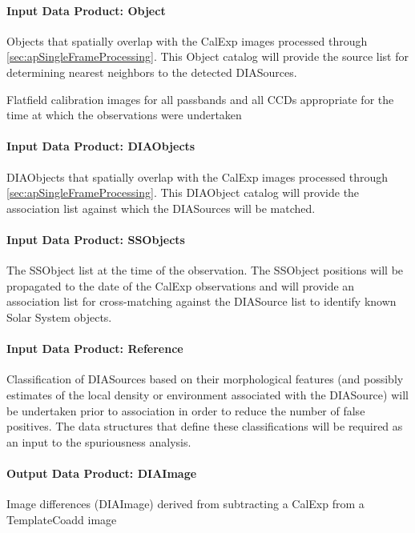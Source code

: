 \paragraph{Input Data Product: Object}

Objects that spatially overlap with the CalExp images processed through \ref{sec:apSingleFrameProcessing}. This Object catalog will provide the source list for determining nearest neighbors to the detected DIASources. 

Flatfield calibration images for all passbands and all CCDs appropriate for the time at which the observations were undertaken 

\paragraph{Input Data Product: DIAObjects}

DIAObjects that spatially overlap with the CalExp images processed through \ref{sec:apSingleFrameProcessing}. This DIAObject catalog will provide the association  list against which the DIASources will be matched. 

\paragraph{Input Data Product: SSObjects}

The SSObject list at the time of the observation. The SSObject positions will be propagated to the date of the CalExp observations and will provide an association  list for cross-matching against the DIASource list to identify known Solar System objects.

\paragraph{Input Data Product: Reference}

Classification of DIASources based on their morphological features (and possibly estimates of the local density or  environment associated with the DIASource) will be undertaken prior to association in order to reduce the number of false positives. The data structures that define these classifications will be required as an input to the spuriousness analysis. 

\paragraph{Output Data Product: DIAImage}

Image differences (DIAImage) derived from subtracting a CalExp from a TemplateCoadd image 

